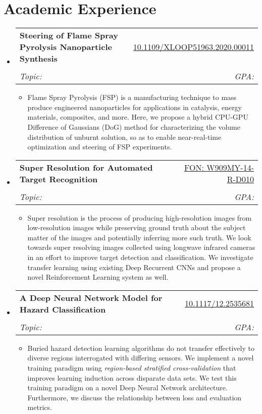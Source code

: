 \documentclass[letterpaper,11pt]{article}
\makeatletter
\newcommand{\resumeSubheading}[6]{
  \vspace{-1pt}\item
    \begin{tabular*}{0.97\textwidth}{l@{\extracolsep{\fill}}r}
      \textbf{#1} & #2
      \ifthenelse{\equal{#3}{}}{}{
        \\ \textit{\small#3} & \textit{\small #4}
      } 
      \ifthenelse{\equal{#5}{}}{}{
        \\ \textit{\small Topic: #5}
      }
      \ifthenelse{\equal{#6}{}}{}{
         & \textit{\small GPA: #6}
      }
    \end{tabular*}\vspace{-5pt}
}
\newcommand{\resumeSubHeadingListStart}{\begin{itemize}[leftmargin=*]}
\newcommand{\resumeSubHeadingListEnd}{\end{itemize}}
\newcommand{\resumeItemListStart}{\begin{itemize}}
\newcommand{\resumeItemListEnd}{\end{itemize}\vspace{-5pt}}
\makeatother
\begin{document}
\section{Academic Experience}
  \resumeSubHeadingListStart
    \resumeSubheading
      {Steering of Flame Spray Pyrolysis Nanoparticle Synthesis}{\href{https://conferences.computer.org/scwpub/pdfs/XLOOP2020-78HhbO4BRAvWFG2azrH595/107200a035/107200a035.pdf}{10.1109/XLOOP51963.2020.00011}}
      {}{}{}{}
      \resumeItemListStart
        \item[] \small{
          Flame Spray Pyrolysis (FSP) is a manufacturing technique to mass produce engineered nanoparticles for applications in catalysis, energy materials, composites, and more. 
          Here, we propose a hybrid CPU-GPU Difference of Gaussians (DoG) method for characterizing the volume distribution of unburnt solution, so as to enable near-real-time optimization and steering of FSP experiments. 
        }
      \resumeItemListEnd
    \resumeSubheading
      {Super Resolution for Automated Target Recognition}{\href{https://www.afcea.org/event/sites/default/files/files/CERDEC Army Industry Day Slides.pdf}{FON: W909MY-14-R-D010}}
      {}{}{}{}
      \resumeItemListStart
        \item[] \small{
          Super resolution is the process of producing high-resolution images from low-resolution images while preserving ground truth about the subject matter of the images and potentially inferring more such truth. 
          We look towards super resolving images collected using longwave infrared cameras in an effort to improve target detection and classification. 
          We investigate transfer learning using existing Deep Recurrent CNNs and propose a novel Reinforcement Learning system as well.
        }
      \resumeItemListEnd
    \resumeSubheading
      {A Deep Neural Network Model for Hazard Classification}{\href{https://doi.org/10.1117/12.2535681}{10.1117/12.2535681}}
      {}{}{}{}
      \resumeItemListStart
        \item[] \small{ 
          Buried hazard detection learning algorithms do not transfer effectively to diverse regions interrogated with differing sensors. We implement a novel training paradigm using \textit{region-based stratified cross-validation} that improves learning induction across disparate data sets. 
          We test this training paradigm on a novel Deep Neural Network architecture. Furthermore, we discuss the relationship between loss and evaluation metrics.
        }
      \resumeItemListEnd
    \resumeSubHeadingListEnd
\end{document}
